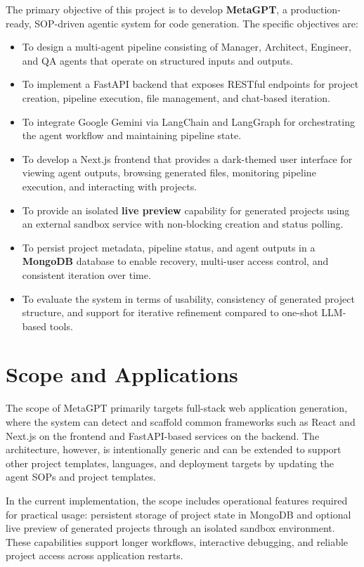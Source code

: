 The primary objective of this project is to develop \textbf{MetaGPT}, a production-ready, SOP-driven agentic system for code generation. The specific objectives are:
\begin{itemize}
    \item To design a multi-agent pipeline consisting of Manager, Architect, Engineer, and QA agents that operate on structured inputs and outputs.
    \item To implement a FastAPI backend that exposes RESTful endpoints for project creation, pipeline execution, file management, and chat-based iteration.
    \item To integrate Google Gemini via LangChain and LangGraph for orchestrating the agent workflow and maintaining pipeline state.
    \item To develop a Next.js frontend that provides a dark-themed user interface for viewing agent outputs, browsing generated files, monitoring pipeline execution, and interacting with projects.
    \item To provide an isolated \textbf{live preview} capability for generated projects using an external sandbox service with non-blocking creation and status polling.
    \item To persist project metadata, pipeline status, and agent outputs in a \textbf{MongoDB} database to enable recovery, multi-user access control, and consistent iteration over time.
    \item To evaluate the system in terms of usability, consistency of generated project structure, and support for iterative refinement compared to one-shot LLM-based tools.
\end{itemize}

\section{Scope and Applications}

The scope of MetaGPT primarily targets full-stack web application generation, where the system can detect and scaffold common frameworks such as React and Next.js on the frontend and FastAPI-based services on the backend. The architecture, however, is intentionally generic and can be extended to support other project templates, languages, and deployment targets by updating the agent SOPs and project templates.

In the current implementation, the scope includes operational features required for practical usage: persistent storage of project state in MongoDB and optional live preview of generated projects through an isolated sandbox environment. These capabilities support longer workflows, interactive debugging, and reliable project access across application restarts.

